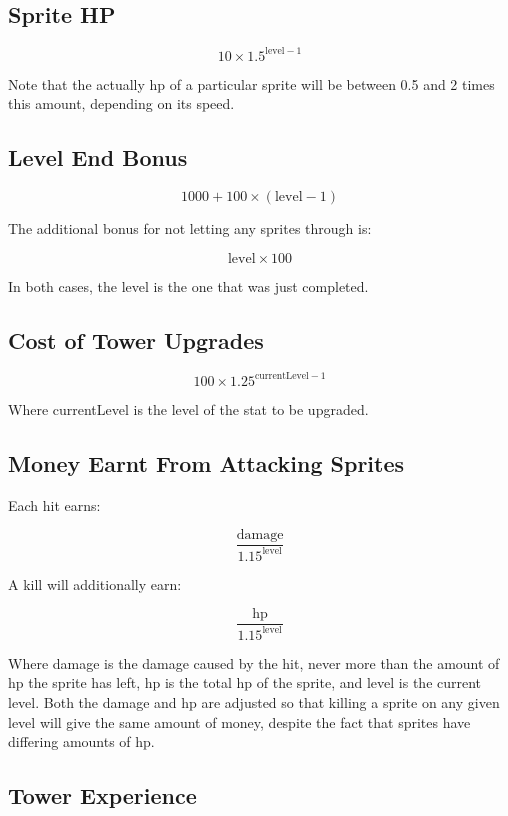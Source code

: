 \documentclass[a4paper,11pt]{article}
\begin{document}
\subsection{Sprite HP}

\[10 \times 1.5^{\mathrm{level} - 1}\]

Note that the actually hp of a particular sprite will be between 0.5 and 2 times this amount, depending on its speed.

\subsection{Level End Bonus}

\[1000 + 100 \times \left( \mathrm{level} - 1 \right)\]

The additional bonus for not letting any sprites through is:

\[\mathrm{level} \times 100\]

In both cases, the level is the one that was just completed.

\subsection{Cost of Tower Upgrades}

\[100 \times 1.25^{\mathrm{currentLevel} - 1}\]

Where currentLevel is the level of the stat to be upgraded.

\subsection{Money Earnt From Attacking Sprites}

Each hit earns:

\[\frac{\mathrm{damage}}{1.15^{\mathrm{level}}}\]

A kill will additionally earn:

\[\frac{\mathrm{hp}}{1.15^{\mathrm{level}}}\]

Where damage is the damage caused by the hit, never more than the amount of hp the sprite has left, hp is the total hp of the sprite, and level is the current level. Both the damage and hp are adjusted so that killing a sprite on any given level will give the same amount of money, despite the fact that sprites have differing amounts of hp.

\subsection{Tower Experience}
\end{document}
